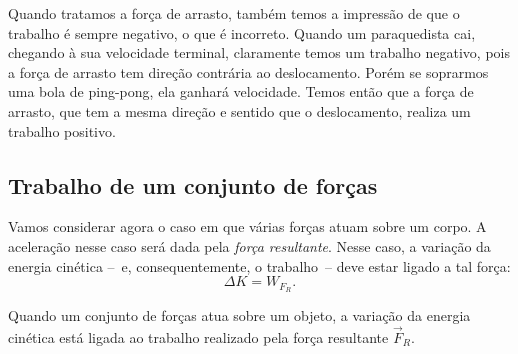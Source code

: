 Quando tratamos a força de arrasto, também temos a impressão de que o trabalho é sempre negativo, o que é incorreto. Quando um paraquedista cai, chegando à sua velocidade terminal, claramente temos um trabalho negativo, pois a força de arrasto tem direção contrária ao deslocamento. Porém se soprarmos uma bola de ping-pong, ela ganhará velocidade. Temos então que a força de arrasto, que tem a mesma direção e sentido que o deslocamento, realiza um trabalho positivo.

\subsection{Trabalho de um conjunto de forças}

Vamos considerar agora o caso em que várias forças atuam sobre um corpo. A aceleração nesse caso será dada pela \emph{força resultante}. Nesse caso, a variação da energia cinética --~e, consequentemente, o trabalho~-- deve estar ligado a tal força:
\begin{equation}
    \Delta K = W_{F_R}.
\end{equation}
%
\begin{marginfigure}
\centering
{}
\caption{Quando um conjunto de forças atua sobre um objeto, a variação da energia cinética está ligada ao trabalho realizado pela força resultante $\vec{F}_R$. \label{Fig:TrabalhoDiversasForcas}}
\end{marginfigure}

